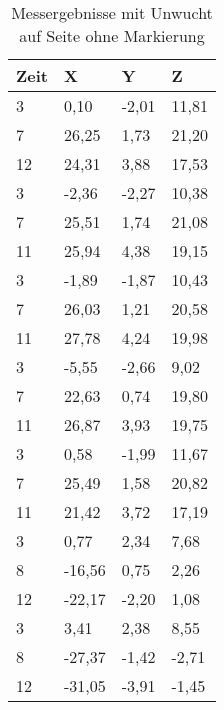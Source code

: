\begin{table}[]
\centering
\begin{tabular}{llll}
\textbf{Zeit} & \textbf{X} & \textbf{Y } & \textbf{Z} \\
\hline
\hline
3    & 0,10   & -2,01 & 11,81 \\
7    & 26,25  & 1,73  & 21,20 \\
12   & 24,31  & 3,88  & 17,53 \\
\hline
3    & -2,36  & -2,27 & 10,38 \\
7    & 25,51  & 1,74  & 21,08 \\
11   & 25,94  & 4,38  & 19,15 \\
\hline
3    & -1,89  & -1,87 & 10,43 \\
7    & 26,03  & 1,21  & 20,58 \\
11   & 27,78  & 4,24  & 19,98 \\
\hline
3    & -5,55  & -2,66 & 9,02  \\
7    & 22,63  & 0,74  & 19,80 \\
11   & 26,87  & 3,93  & 19,75 \\
\hline
3    & 0,58   & -1,99 & 11,67 \\
7    & 25,49  & 1,58  & 20,82 \\
11   & 21,42  & 3,72  & 17,19 \\
\hline
3    & 0,77   & 2,34  & 7,68  \\
8    & -16,56 & 0,75  & 2,26  \\
12   & -22,17 & -2,20 & 1,08  \\
\hline
3    & 3,41   & 2,38  & 8,55  \\
8    & -27,37 & -1,42 & -2,71 \\
12   & -31,05 & -3,91 & -1,45
\end{tabular}
\caption{Messergebnisse mit Unwucht auf Seite ohne Markierung}
\label{tab:imbalance_other_side-full}
\end{table}
